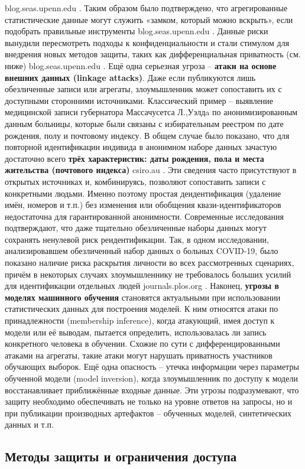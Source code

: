 blog.seas.upenn.edu
. Таким образом было подтверждено, что агрегированные статистические данные могут служить «замком, который можно вскрыть», если подобрать правильные инструменты
blog.seas.upenn.edu
. Данные риски вынудили пересмотреть подходы к конфиденциальности и стали стимулом для внедрения новых методов защиты, таких как дифференциальная приватность (см. ниже)
blog.seas.upenn.edu
. Ещё одна серьезная угроза – \textbf{атаки на основе внешних данных (linkage attacks)}. Даже если публикуются лишь обезличенные записи или агрегаты, злоумышленник может сопоставить их с доступными сторонними источниками. Классический пример – выявление медицинской записи губернатора Массачусетса Л.,Уэлдa по анонимизированным данным больницы, которые были связаны с избирательным реестром по дате рождения, полу и почтовому индексу. В общем случае было показано, что для повторной идентификации индивида в анонимном наборе данных зачастую достаточно всего \textbf{трёх характеристик: даты рождения, пола и места жительства (почтового индекса)}
csiro.au
. Эти сведения часто присутствуют в открытых источниках и, комбинируясь, позволяют сопоставить записи с конкретными людьми. Именно поэтому простая деидентификация (удаление имён, номеров и т.п.) без изменения или обобщения квази-идентификаторов недостаточна для гарантированной анонимности. Современные исследования подтверждают, что даже тщательно обезличенные наборы данных могут сохранять ненулевой риск реидентификации. Так, в одном исследовании, анализировавшем обезличенный набор данных о больных COVID-19, было показано наличие риска раскрытия личности во всех рассмотренных сценариях, причём в некоторых случаях злоумышленнику не требовалось больших усилий для идентификации отдельных людей
journals.plos.org
. Наконец, \textbf{угрозы в моделях машинного обучения} становятся актуальными при использовании статистических данных для построения моделей. К ним относятся атаки по принадлежности (membership inference), когда атакующий, имея доступ к модели или её выводам, пытается определить, использовалась ли запись конкретного человека в обучении. Схожие по сути с дифференцированными атаками на агрегаты, такие атаки могут нарушать приватность участников обучающих выборок. Ещё одна опасность – утечка информации через параметры обученной модели (model inversion), когда злоумышленник по доступу к модели восстанавливает приближённые входные данные. Эти угрозы подразумевают, что защиту необходимо обеспечивать не только на уровне ответов на запросы, но и при публикации производных артефактов – обученных моделей, синтетических данных и т.п. \subsection{Методы защиты и ограничения доступа}
